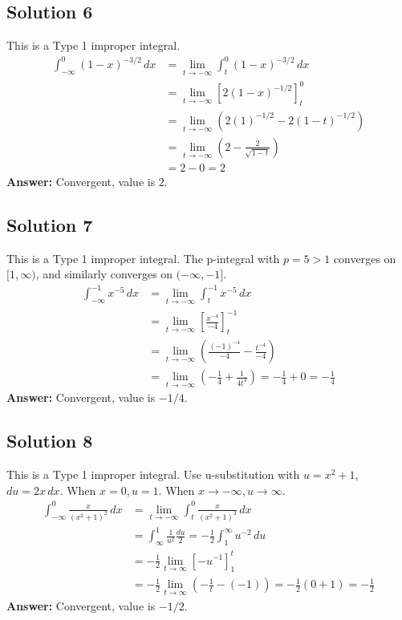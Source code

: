 \documentclass{article}
\begin{document}
\subsection*{Solution 6}
This is a Type 1 improper integral.
\begin{align*}
\int_{-\infty}^{0} (1-x)^{-3/2} \,dx &= \lim_{t \to -\infty} \int_{t}^{0} (1-x)^{-3/2} \,dx \\
&= \lim_{t \to -\infty} \left[ 2(1-x)^{-1/2} \right]_{t}^{0} \\
&= \lim_{t \to -\infty} \left( 2(1)^{-1/2} - 2(1-t)^{-1/2} \right) \\
&= \lim_{t \to -\infty} \left( 2 - \frac{2}{\sqrt{1-t}} \right) \\
&= 2 - 0 = 2
\end{align*}
\textbf{Answer:} Convergent, value is $2$.

\subsection*{Solution 7}
This is a Type 1 improper integral. The p-integral with $p=5 > 1$ converges on $[1, \infty)$, and similarly converges on $(-\infty, -1]$.
\begin{align*}
\int_{-\infty}^{-1} x^{-5} \,dx &= \lim_{t \to -\infty} \int_{t}^{-1} x^{-5} \,dx \\
&= \lim_{t \to -\infty} \left[ \frac{x^{-4}}{-4} \right]_{t}^{-1} \\
&= \lim_{t \to -\infty} \left( \frac{(-1)^{-4}}{-4} - \frac{t^{-4}}{-4} \right) \\
&= \lim_{t \to -\infty} \left( -\frac{1}{4} + \frac{1}{4t^4} \right) = -\frac{1}{4} + 0 = -\frac{1}{4}
\end{align*}
\textbf{Answer:} Convergent, value is $-1/4$.

\subsection*{Solution 8}
This is a Type 1 improper integral. Use u-substitution with $u=x^2+1$, $du=2x\,dx$. When $x=0, u=1$. When $x \to -\infty, u \to \infty$.
\begin{align*}
\int_{-\infty}^{0} \frac{x}{(x^2+1)^2} \,dx &= \lim_{t \to -\infty} \int_{t}^{0} \frac{x}{(x^2+1)^2} \,dx \\
&= \int_{\infty}^{1} \frac{1}{u^2} \frac{du}{2} = -\frac{1}{2} \int_{1}^{\infty} u^{-2} \,du \\
&= -\frac{1}{2} \lim_{t \to \infty} \left[ -u^{-1} \right]_{1}^{t} \\
&= -\frac{1}{2} \lim_{t \to \infty} \left( -\frac{1}{t} - (-1) \right) = -\frac{1}{2}(0+1) = -\frac{1}{2}
\end{align*}
\textbf{Answer:} Convergent, value is $-1/2$.
\end{document}
